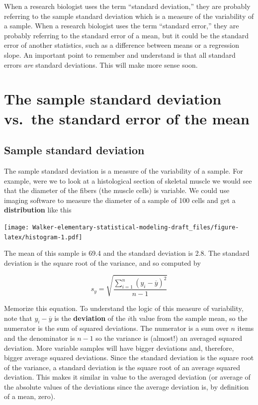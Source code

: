 \documentclass[]{book}
\begin{document}
When a research biologist uses the term ``standard deviation,'' they are
probably referring to the sample standard deviation which is a measure
of the variability of a sample. When a research biologist uses the term
``standard error,'' they are probably referring to the standard error of
a mean, but it could be the standard error of another statistics, such
as a difference between means or a regression slope. An important point
to remember and understand is that all standard errors \emph{are}
standard deviations. This will make more sense soon.

\section{The sample standard deviation vs.~the standard error of the
mean}\label{the-sample-standard-deviation-vs.the-standard-error-of-the-mean}

\subsection{Sample standard deviation}\label{sample-standard-deviation}

The sample standard deviation is a measure of the variability of a
sample. For example, were we to look at a histological section of
skeletal muscle we would see that the diameter of the fibers (the muscle
cells) is variable. We could use imaging software to measure the
diameter of a sample of 100 cells and get a \textbf{distribution} like
this

\texttt{[image: Walker-elementary-statistical-modeling-draft\_files/figure-latex/histogram-1.pdf]}

The mean of this sample is 69.4 and the standard deviation is 2.8. The
standard deviation is the square root of the variance, and so computed
by

\begin{equation}
s_y = \sqrt{\frac{\sum_{i=1}^n{(y_i - \overline{y})^2}}{n-1}}
\label{eq:variance}
\end{equation}

Memorize this equation. To understand the logic of this measure of
variability, note that \(y_i - \overline{y}\) is the \textbf{deviation}
of the \(i\)th value from the sample mean, so the numerator is the sum
of squared deviations. The numerator is a sum over \(n\) items and the
denominator is \(n-1\) so the variance is (almost!) an averaged squared
deviation. More variable samples will have bigger deviations and,
therefore, bigger average squared deviations. Since the standard
deviation is the square root of the variance, a standard deviation is
the square root of an average squared deviation. This makes it similar
in value to the averaged deviation (or average of the absolute values of
the deviations since the average deviation is, by definition of a mean,
zero).
\end{document}
